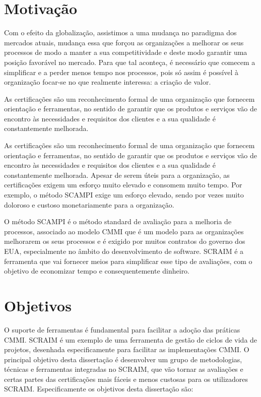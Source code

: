 \documentclass[9pt,a4paper]{extarticle}
\begin{document}
\begin{multicols}{2}

\section{Motivação}\label{sec:motiva}

Com o efeito da globalização, assistimos a uma mudança no paradigma dos mercados atuais, mudança essa que forçou as organizações a melhorar os seus processos de modo a manter a sua competitividade e deste modo garantir uma posição favorável no mercado. Para que tal aconteça, é necessário que comecem a simplificar e a perder menos tempo nos processos, pois só assim é possível à organização focar-se no que realmente interessa: a criação de valor.

As certificações são um reconhecimento formal de uma organização que fornecem orientação e ferramentas, no sentido de garantir que os produtos e serviços vão de encontro às necessidades e requisitos dos clientes e a sua qualidade é constantemente melhorada.

As certificações são um reconhecimento formal de uma organização que fornecem orientação e ferramentas, no sentido de garantir que os produtos e serviços vão de encontro às necessidades e requisitos dos clientes e a sua qualidade é constantemente melhorada. Apesar de serem úteis para a organização, as certificações exigem um esforço muito elevado e consomem muito tempo. Por exemplo, o método SCAMPI exige um esforço elevado, sendo por vezes muito doloroso e custoso monetariamente para a organização.


O método SCAMPI é o método standard de avaliação para a melhoria de processos, associado ao modelo CMMI que é um modelo para as organizações melhorarem os seus processos e é exigido por muitos contratos do governo dos EUA, especialmente no âmbito do desenvolvimento de software. SCRAIM é a ferramenta que vai fornecer meios para simplificar esse tipo de avaliações, com o objetivo de economizar tempo e consequentemente dinheiro.


\section{Objetivos}\label{sec:goals}

O suporte de ferramentas é fundamental para facilitar a adoção das práticas CMMI.
SCRAIM \cite{SCRAIM} é um exemplo de uma ferramenta de gestão de ciclos de vida de projetos, desenhada especificamente para facilitar as implementações CMMI.
O principal objetivo desta dissertação é desenvolver um grupo de metodologias, técnicas e ferramentas integradas no SCRAIM, que vão tornar as avaliações e certas partes das certificações mais fáceis e menos custosas para os utilizadores SCRAIM.
Especificamente os objetivos desta dissertação são:


\end{multicols}
\end{document}
